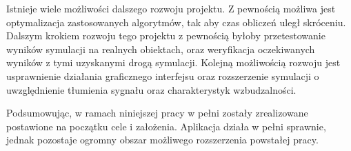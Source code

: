 Istnieje wiele możliwości dalszego rozwoju projektu. Z pewnością możliwa jest optymalizacja zastosowanych algorytmów, tak aby czas obliczeń uległ skróceniu. Dalszym krokiem rozwoju tego projektu z pewnością byłoby przetestowanie wyników symulacji na realnych obiektach, oraz weryfikacja oczekiwanych wyników z tymi uzyskanymi drogą symulacji. Kolejną możliwością rozwoju jest usprawnienie działania graficznego interfejsu oraz rozszerzenie symulacji o uwzględnienie tłumienia sygnału oraz charakterystyk wzbudzalności. 

Podsumowując, w ramach niniejszej pracy w pełni zostały zrealizowane postawione na początku cele i założenia. Aplikacja działa w pełni sprawnie, jednak pozostaje ogromny obszar możliwego rozszerzenia powstałej pracy.